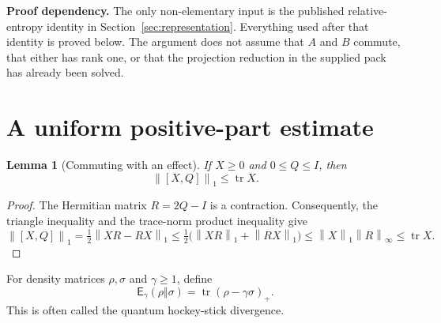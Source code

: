 \documentclass[11pt]{article}
\numberwithin{equation}{section}
\newtheorem{lemma}[theorem]{Lemma}
\theoremstyle{remark}
\DeclareMathOperator{\tr}{tr}
\newcommand{\Id}{I}
\newcommand{\one}[1]{\left\lVert #1\right\rVert_1}
\newcommand{\op}[1]{\left\lVert #1\right\rVert_\infty}
\newcommand{\hs}{\mathsf E}
\begin{document}
\textbf{Proof dependency.} The only non-elementary input is the published
relative-entropy identity in Section~\ref{sec:representation}.
Everything used after that identity is proved below. The argument does
not assume that $A$ and $B$ commute, that either has rank one, or that the
projection reduction in the supplied pack has already been solved.

\section{A uniform positive-part estimate}

\begin{lemma}[Commuting with an effect]
\label{lem:effect}
If $X\ge0$ and $0\le Q\le\Id$, then
\begin{equation}
 \one{[X,Q]}\le\tr X.
 \label{eq:effect}
\end{equation}
\end{lemma}
\begin{proof}
The Hermitian matrix $R=2Q-\Id$ is a contraction. Consequently, the
triangle inequality and the trace-norm product inequality give
\[
 \one{[X,Q]}=\tfrac12\one{XR-RX}
 \le\tfrac12\bigl(\one{XR}+\one{RX}\bigr)
 \le\one{X}\op{R}\le\tr X.
\]
\end{proof}

For density matrices $\rho,\sigma$ and $\gamma\ge1$, define
\begin{equation}
 \hs_\gamma(\rho\Vert\sigma)
   =\tr(\rho-\gamma\sigma)_+.
 \label{eq:hockey}
\end{equation}
This is often called the quantum hockey-stick divergence.
\end{document}

